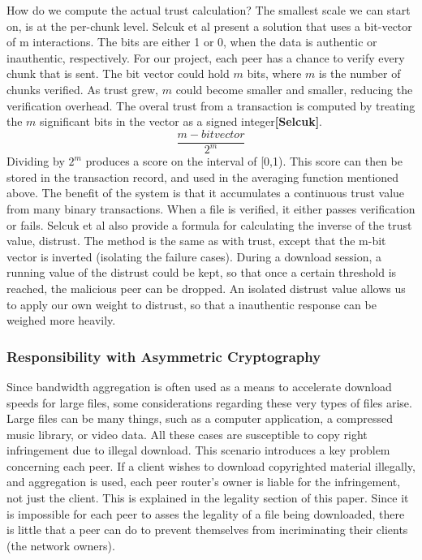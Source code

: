 \documentclass[12pt]{article}
\newcommand{\lcite}[1]
{{\bfseries\color{orange}[#1]}}
\begin{document}
			How do we compute the actual trust calculation? The smallest scale we can start on, is at the per-chunk level. Selcuk et al present a solution that uses a bit-vector of m interactions. The bits are either 1 or 0, when the data is authentic or inauthentic, respectively. For our project, each peer has a chance to verify every chunk that is sent. The bit vector could hold $m$ bits, where $m$ is the number of chunks verified. As trust grew, $m$ could become smaller and smaller, reducing the verification overhead. The overal trust from a transaction is computed by treating the $m$ significant bits in the vector as a signed integer\lcite{Selcuk}.
				$$
						\frac{m-bit vector}{2^m}
				$$
			Dividing by $2^m$ produces a score on the interval of [0,1). This score can then be stored in the transaction record, and used in the averaging function mentioned above. The benefit of the system is that it accumulates a continuous trust value from many binary transactions. When a file is verified, it either passes verification or fails. Selcuk et al also provide a formula for calculating the inverse of the trust value, distrust. The method is the same as with trust, except that the m-bit vector is inverted (isolating the failure cases). During a download session, a running value of the distrust could be kept, so that once a certain threshold is reached, the malicious peer can be dropped. An isolated distrust value allows us to apply our own weight to distrust, so that a inauthentic response can be weighed more heavily. 




		\subsubsection{Responsibility with Asymmetric Cryptography}

			Since bandwidth aggregation is often used as a means to accelerate download speeds for large files, some considerations regarding these very types of files arise. Large files can be many things, such as a computer application, a compressed music library, or video data. All these cases are susceptible to copy right infringement due to illegal download. This scenario introduces a key problem concerning each peer. If a client wishes to download copyrighted material illegally, and aggregation is used, each peer router's owner is liable for the infringement, not just the client. This is explained in the legality section of this paper. Since it is impossible for each peer to asses the legality of a file being downloaded, there is little that a peer can do to prevent themselves from incriminating their clients (the network owners). 
\end{document}
